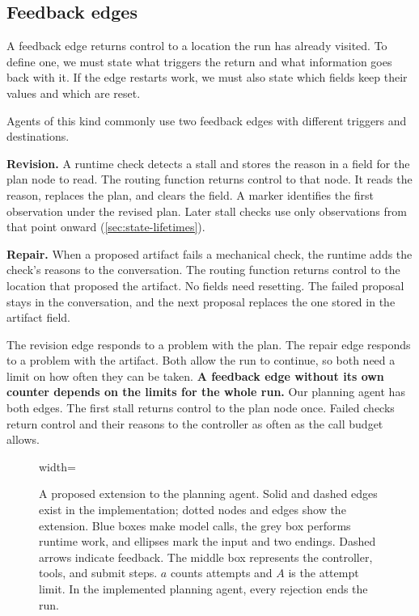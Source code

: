 \subsection{Feedback edges}
\label{sec:control-backedges}

A feedback edge returns control to a location the run has already visited. To define one, we must
state what triggers the return and what information goes back with it. If the edge restarts work,
we must also state which fields keep their values and which are reset.

Agents of this kind commonly use two feedback edges with different triggers and destinations.

\bi

\item \textbf{Revision.} A runtime check detects a stall and stores the reason in a field for
the plan node to read. The routing function returns control to that node. It reads the reason,
replaces the plan, and clears the field. A marker identifies the first observation under the
revised plan. Later stall checks use only observations from that point onward
(\cref{sec:state-lifetimes}).

\item \textbf{Repair.} When a proposed artifact fails a mechanical check, the runtime adds the
check's reasons to the conversation. The routing function returns control to the location that
proposed the artifact. No fields need resetting. The failed proposal stays in the conversation,
and the next proposal replaces the one stored in the artifact field.

\ei

The revision edge responds to a problem with the plan. The repair edge responds to a problem with
the artifact. Both allow the run to continue, so both need a limit on how often they can be taken.
\textbf{A feedback edge without its own counter depends on the limits for the whole run.} Our
planning agent has both edges. The first stall returns control to the plan node once. Failed
checks return control and their reasons to the controller as often as the call budget allows.

\begin{figure}[htbp]
  \centering
  \begin{adjustbox}{width=\linewidth}\end{adjustbox}
  \caption{A proposed extension to the planning agent. Solid and dashed edges exist in the implementation;
  dotted nodes and edges show the extension. Blue boxes make model calls, the grey box performs
  runtime work, and ellipses mark the input and two endings. Dashed arrows indicate feedback.
  The middle box represents the controller, tools, and submit steps. $a$ counts attempts and $A$
  is the attempt limit. In the implemented planning agent, every rejection ends the run.}
  \label{fig:control-extension}
\end{figure}

